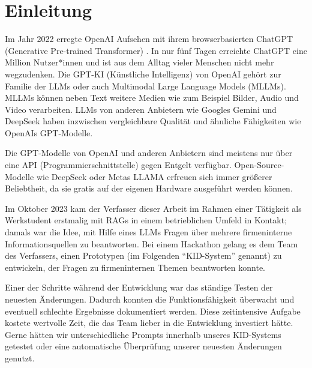 \chapter{Einleitung}

Im Jahr 2022 erregte OpenAI Aufsehen mit ihrem browserbasierten ChatGPT (Generative Pre-trained Transformer) \cite{2023arXiv230308774O}.
In nur fünf Tagen erreichte ChatGPT eine Million Nutzer*innen \cite{doit_software_chatgpt_2025} und ist aus dem Alltag vieler Menschen nicht mehr wegzudenken.
Die GPT-KI (Künstliche Intelligenz) von OpenAI gehört zur Familie der LLMs oder auch Multimodal Large Language Models (MLLMs).
MLLMs können neben Text weitere Medien wie zum Beispiel Bilder, Audio und Video verarbeiten.
LLMs von anderen Anbietern wie Googles Gemini \cite{2023arXiv231211805G,2024arXiv240305530G} und DeepSeek \cite{2025arXiv250112948D} haben inzwischen vergleichbare Qualität und ähnliche Fähigkeiten wie OpenAIs GPT-Modelle.

Die GPT-Modelle von OpenAI und anderen Anbietern sind meistens nur über eine API (Programmierschnittstelle) gegen Entgelt verfügbar.
Open-Source-Modelle wie DeepSeek \cite{2025arXiv250112948D} oder Metas LLAMA \cite{2023arXiv230709288T} erfreuen sich immer größerer Beliebtheit, da sie gratis auf der eigenen Hardware ausgeführt werden können.

Im Oktober 2023 kam der Verfasser dieser Arbeit im Rahmen einer Tätigkeit als Werkstudent erstmalig mit RAGs in einem betrieblichen Umfeld in Kontakt; damals war die Idee, mit Hilfe eines LLMs Fragen über mehrere firmeninterne Informationsquellen zu beantworten.
Bei einem Hackathon gelang es dem Team des Verfassers, einen Prototypen (im Folgenden \enquote{KID-System} genannt) zu entwickeln, der Fragen zu firmeninternen Themen beantworten konnte.

Einer der Schritte während der Entwicklung war das ständige Testen der neuesten Änderungen. Dadurch konnten die Funktionsfähigkeit überwacht und eventuell schlechte Ergebnisse dokumentiert werden.
Diese zeitintensive Aufgabe kostete wertvolle Zeit, die das Team lieber in die Entwicklung investiert hätte.
Gerne hätten wir unterschiedliche Prompts innerhalb unseres KID-Systems getestet oder eine automatische Überprüfung unserer neuesten Änderungen genutzt.

